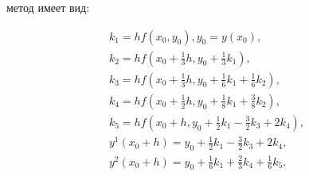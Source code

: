 \documentclass[10pt]{article}
\begin{document}
метод имеет вид:



\[

\begin{gathered}

k_{1}=h f\left(x_{0}, y_{0}\right), y_{0}=y\left(x_{0}\right), \\

k_{2}=h f\left(x_{0}+\frac{1}{3} h, y_{0}+\frac{1}{3} k_{1}\right), \\

k_{3}=h f\left(x_{0}+\frac{1}{3} h, y_{0}+\frac{1}{6} k_{1}+\frac{1}{6} k_{2}\right), \\

k_{4}=h f\left(x_{0}+\frac{1}{2} h, y_{0}+\frac{1}{8} k_{1}+\frac{3}{8} k_{2}\right), \\

k_{5}=h f\left(x_{0}+h, y_{0}+\frac{1}{2} k_{1}-\frac{3}{2} k_{3}+2 k_{4}\right), \\

y^{1}\left(x_{0}+h\right)=y_{0}+\frac{1}{2} k_{1}-\frac{3}{2} k_{3}+2 k_{4}, \\

y^{2}\left(x_{0}+h\right)=y_{0}+\frac{1}{6} k_{1}+\frac{2}{3} k_{4}+\frac{1}{6} k_{5} .

\end{gathered}

\]
\end{document}
